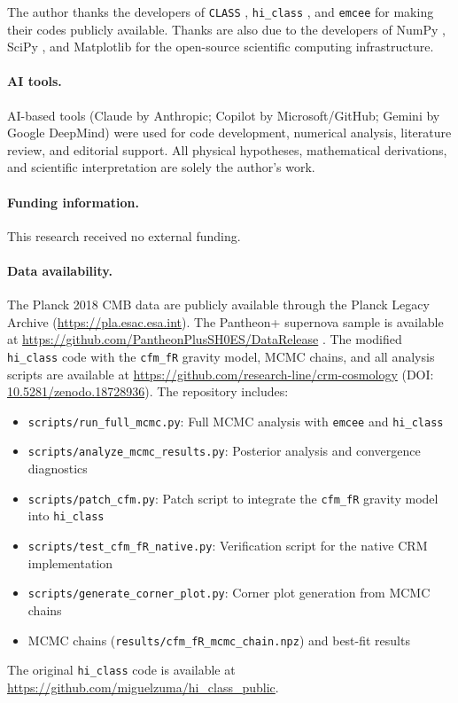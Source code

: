 \documentclass[aps,prd,twocolumn,superscriptaddress,nofootinbib]{revtex4-2}
\begin{document}
\begin{acknowledgments}
The author thanks the developers of \texttt{CLASS} \cite{Blas2011},
\texttt{hi\_class} \cite{Zumalacarregui2017}, and
\texttt{emcee} \cite{ForemanMackey2013} for making their codes publicly
available. Thanks are also due to the developers of NumPy \cite{Harris2020},
SciPy \cite{Virtanen2020}, and Matplotlib \cite{Hunter2007} for the
open-source scientific computing infrastructure.

\paragraph{AI tools.}
AI-based tools (Claude by Anthropic; Copilot by Microsoft/GitHub; Gemini by Google DeepMind) were used
for code development, numerical analysis, literature review, and editorial
support. All physical hypotheses, mathematical derivations, and scientific
interpretation are solely the author's work.
\end{acknowledgments}

\paragraph{Funding information.}
This research received no external funding.

\paragraph{Data availability.}
The Planck 2018 CMB data are publicly available through the Planck Legacy
Archive (\url{https://pla.esac.esa.int}). The Pantheon+ supernova sample is
available at \url{https://github.com/PantheonPlusSH0ES/DataRelease}
\cite{Scolnic2022}. The modified \texttt{hi\_class} code with the
\texttt{cfm\_fR} gravity model, MCMC chains, and all analysis scripts are
available at \url{https://github.com/research-line/crm-cosmology}
(DOI: \href{https://doi.org/10.5281/zenodo.18728936}{10.5281/zenodo.18728936}).
The repository includes:
\begin{itemize}
\item \texttt{scripts/run\_full\_mcmc.py}: Full MCMC analysis with \texttt{emcee} and \texttt{hi\_class}
\item \texttt{scripts/analyze\_mcmc\_results.py}: Posterior analysis and convergence diagnostics
\item \texttt{scripts/patch\_cfm.py}: Patch script to integrate the \texttt{cfm\_fR} gravity model into \texttt{hi\_class}
\item \texttt{scripts/test\_cfm\_fR\_native.py}: Verification script for the native CRM implementation
\item \texttt{scripts/generate\_corner\_plot.py}: Corner plot generation from MCMC chains
\item MCMC chains (\texttt{results/cfm\_fR\_mcmc\_chain.npz}) and best-fit results
\end{itemize}
The original \texttt{hi\_class} code is available at
\url{https://github.com/miguelzuma/hi\_class\_public}.
\end{document}
